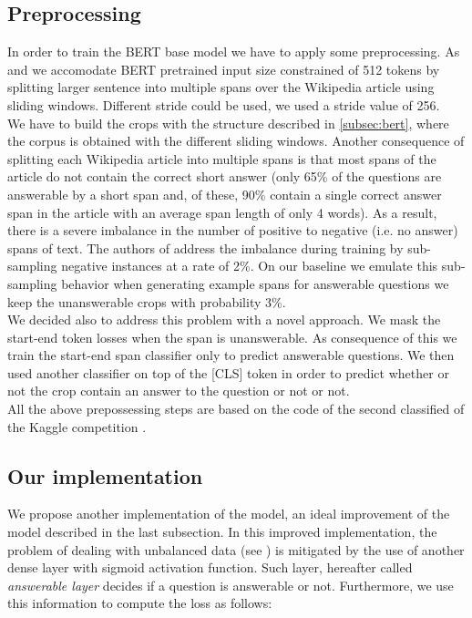 \documentclass[10pt,hidelinks]{article}
\begin{document}
%

\subsection{Preprocessing} \label{preprocessing}
In order to train the BERT base model we have to apply some preprocessing. As \cite{alberti} and \cite{IBM} we accomodate BERT pretrained input size constrained of 512 tokens by splitting larger sentence into multiple spans over the Wikipedia article using sliding windows. Different stride could be used, we used a stride value of 256.\\
We have to build the crops with the structure described in \cref{subsec:bert}, where the corpus is obtained with the different sliding windows. 
Another consequence of splitting each Wikipedia article into multiple
spans is that most spans of the article do not contain the
correct short answer (only 65\% of the questions are answerable by a short span and, of these, 90\% contain a
single correct answer span in the article with an average
span length of only 4 words). As a result, there is a severe imbalance in the number of positive to negative (i.e.
no answer) spans of text. The authors of \cite{alberti} address the imbalance during training
by sub-sampling negative instances at a rate of 2\%.
On our baseline we emulate this sub-sampling behavior when generating example spans for answerable questions we keep the unanswerable crops with probability 3\%. \\
We decided also to address this problem with a novel approach. We mask the start-end token losses when the span is unanswerable. As consequence of this we train the start-end span classifier only to predict answerable questions. We then used another classifier on top of the [CLS] token in order to predict whether or not the crop contain an answer to the question or not or not. \\
All the above prepossessing steps are based on the code of the second classified of the Kaggle competition \cite{see}.

\subsection{Our implementation}\label{subsec:finetuning}

We propose another implementation of the model, an ideal improvement of the model described in the last subsection.
In this improved implementation, the problem of dealing with unbalanced data (see ) is mitigated by the use of another dense layer with sigmoid activation function. Such layer, hereafter called \emph{answerable layer} decides if a question is answerable or not. Furthermore, we use this information to compute the loss as follows: 
\end{document}
